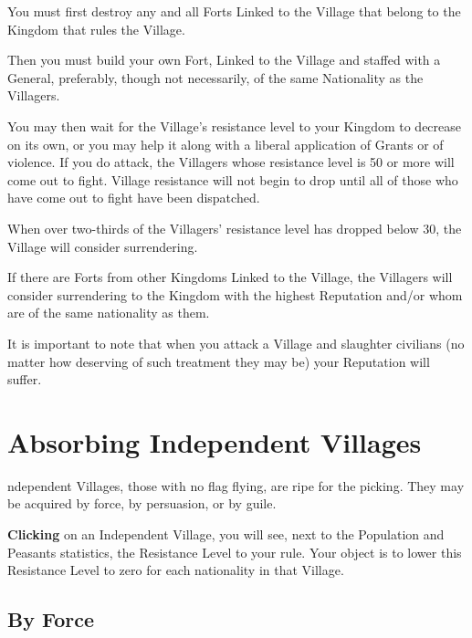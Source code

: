 You must first destroy any and all Forts Linked to the Village that belong to the Kingdom that rules the Village.


Then you must build your own Fort, Linked to the Village and staffed with a General, preferably, though not necessarily, of the same Nationality as the Villagers.


You may then wait for the Village’s resistance level to your Kingdom to decrease on its own, or you may help it along with a liberal application of Grants or of violence. If you do attack, the Villagers whose resistance level is 50 or more will come out to fight. Village resistance will not begin to drop until all of those who have come out to fight have been dispatched.


When over two-thirds of the Villagers’ resistance level has dropped below 30, the Village will consider surrendering.

If there are Forts from other Kingdoms Linked to the Village, the Villagers will consider surrendering to the Kingdom with the highest Reputation and/or whom are of the same nationality as them.


It is important to note that when you attack a Village and slaughter civilians (no matter how deserving of such treatment they may be) your Reputation will suffer.

\section{\textsf{Absorbing Independent Villages}}


ndependent Villages, those with no flag flying, are ripe for the picking. They may be acquired by force, by persuasion, or by guile.


\textbf{Clicking} on an Independent Village, you will see, next to the Population and Peasants statistics, the Resistance Level to your rule. Your object is to lower this Resistance Level to zero for each nationality in that Village.

\subsection{\textsf{By Force}}

